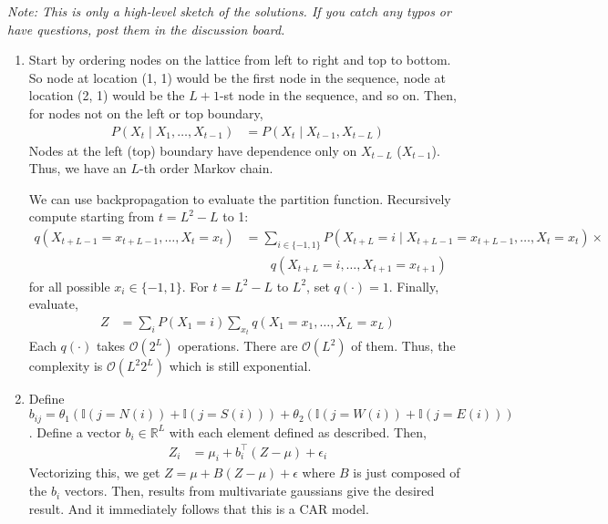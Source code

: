 \documentclass[11pt]{article}
\begin{document}
\begin{center}
  \setlength\fboxsep{0.5cm}
\end{center}

\textit{Note: This is only a high-level sketch of the solutions. If you catch any typos or have questions, post them in the discussion board.}


\begin{enumerate}

\item Start by ordering nodes on the lattice from left to right and top to bottom. So node at location (1, 1) would be the first node in the sequence, node at location (2, 1) would be the $L+1$-st node in the sequence, and so on. Then, for nodes not on the left or top boundary,
\begin{align*}
	P(X_t \mid X_1, \dots, X_{t-1}) &= P(X_t \mid X_{t-1}, X_{t-L})
\end{align*}
Nodes at the left (top) boundary have dependence only on $X_{t-L}$ ($X_{t-1}$). Thus, we have an $L$-th order Markov chain.

We can use backpropagation to evaluate the partition function. Recursively compute starting from $t = L^2 - L$ to 1:
\begin{align*}
	q(X_{t+L-1} = x_{t+L-1}, \dots, X_{t} = x_{t}) &= \sum_{i \in \{-1, 1\}} P(X_{t+L} = i \mid X_{t+L-1} = x_{t+L-1}, \dots, X_{t} = x_{t}) \times \\
	& \qquad q(X_{t+L} = i, \dots, X_{t+1} = x_{t+1})
\end{align*}
for all possible $x_i \in \{-1, 1\}$. For $t = L^2 - L$ to $L^2$, set $q(\cdot) = 1$. Finally, evaluate,
\begin{align*}
	Z &= \sum_{i} P(X_1 = i) \sum_{x_t} q(X_1 = x_1, \dots, X_L = x_L)	
\end{align*}
Each $q(\cdot)$ takes $\mathcal{O}(2^L)$ operations. There are $\mathcal{O}(L^2)$ of them. Thus, the complexity is $\mathcal{O}(L^2 2^L)$ which is still exponential.

\item Define $b_{ij} = \theta_1 (\mathbb{I}(j = N(i)) + \mathbb{I}(j = S(i))) + \theta_2 (\mathbb{I}(j = W(i)) + \mathbb{I}(j = E(i)))$. Define a vector $b_i \in \mathbb{R}^L$ with each element defined as described. Then,
\begin{align*}
	Z_i &= \mu_i + b_i^{\top} (Z - \mu) + \epsilon_i
\end{align*}
Vectorizing this, we get $Z =\mu +  B (Z - \mu) + \epsilon$ where $B$ is just composed of the $b_i$ vectors. Then, results from multivariate gaussians give the desired result. And it immediately follows that this is a CAR model.


\end{enumerate}
\end{document}
